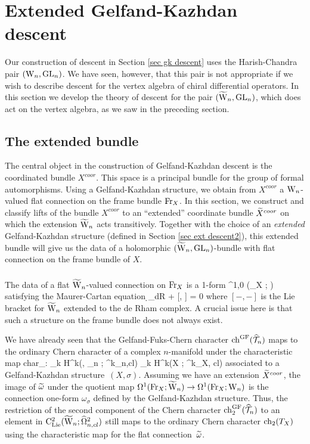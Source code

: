 \section{Extended Gelfand-Kazhdan descent} \label{sec ext desc}

Our construction of descent in Section \ref{sec gk descent} uses the Harish-Chandra pair $(\Vect, \GL_n)$. 
We have seen, however, that this pair is not appropriate 
if we wish to describe descent for the vertex algebra of chiral differential operators. 
In this section we develop the theory of descent for the pair $(\TVect, \GL_n)$, 
which does act on the vertex algebra, as we saw in the preceding section. 

\subsection{The extended bundle}
The central object in the construction of Gelfand-Kazhdan descent is the coordinated bundle $X^{coor}$. 
This space is a principal bundle for the group of formal automorphisms. 
Using a Gelfand-Kazhdan structure, we obtain from $X^{coor}$ a $\Vect$-valued flat connection on the frame bundle $\Fr_X$. 
In this section, we construct and classify lifts of the bundle $X^{coor}$ 
to an ``extended'' coordinate bundle $\Tilde{X}^{coor}$ on which the extension $\TVect$ acts transitively. 
Together with the choice of an {\em extended} Gelfand-Kazhdan structure (defined in Section \ref{sec ext descent2}), 
this extended bundle will give us the data of a holomorphic $(\TVect, \GL_n)$-bundle with flat connection on the frame bundle of $X$.

\subsubsection{} \label{otherway}
 
The data of a flat $\TVect$-valued connection on $\Fr_X$ is a 1-form
\ben
\Tilde{\omega} \in \Omega^{1,0} (\Fr_X ; \TVect)
\een
satisfying the Maurer-Cartan equation
\ben
\d_{dR} \Tilde{\omega} +  [\Tilde{\omega}, \Tilde{\omega}]
= 0
\een 
where $[-,-]$ is the Lie bracket for $\TVect$ extended to the de Rham complex. 
A crucial issue here is that such a structure on the frame bundle does not always exist.

We have already seen that the Gelfand-Fuks-Chern character
$\ch^\GF (\hT_n)$ maps to the ordinary Chern character of a complex
$n$-manifold under the characteristic map 
\ben
{\rm char}_\sigma : \bigoplus_k {\rm H}^k(\Vect , \GL_n ; \hOmega^k_{n,cl}) \to
\bigoplus_k {\rm H}^k(X ; \Omega^k_{X, cl}) 
\een  
associated to a Gelfand-Kazhdan structure~$(X, \sigma)$.
Assuming we have an extension  $\Tilde{X}^{coor}$,
the image of $\Tilde{\omega}$ under the quotient map 
$\Omega^1(\Fr_X ; \TVect) \to \Omega^1(\Fr_X ; \Vect)$ 
is the connection one-form $\omega_\sigma$ defined by the Gelfand-Kazhdan structure. 
Thus, the restriction of the second component of the Chern character $\ch_2^{\GF}(\hT_n)$ to
an element in $\clie^2(\TVect ; \hOmega^2_{n,cl})$ still maps to the
ordinary Chern character $\ch_2(T_X)$ using the characteristic map for
the flat connection~$\Tilde{\omega}$. 

